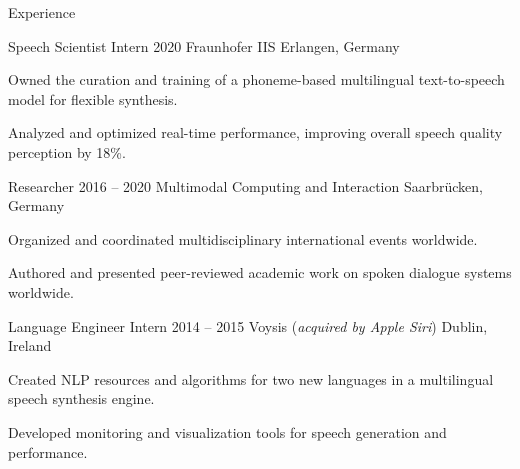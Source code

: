 \documentclass{resume} %
\begin{document}
\begin{rSection}{Experience}
\begin{rSubsection}
\end{rSubsection}

\begin{rSubsection}
	{Speech Scientist Intern}
	{2020}
	{Fraunhofer IIS}
	{Erlangen, Germany}
	
	\setlength{\itemindent}{.5cm}
	
	\item Owned the curation and training of a phoneme-based multilingual text-to-speech model for flexible synthesis.
	\item Analyzed and optimized real-time performance, improving overall speech quality perception by 18\%.
\end{rSubsection}

\begin{rSubsection}
	{Researcher}
	{2016 -- 2020}
	{Multimodal Computing and Interaction}
	{Saarbrücken, Germany}
	
	\setlength{\itemindent}{.5cm}
	
	\item Organized and coordinated multidisciplinary international events worldwide.
	\item Authored and presented peer-reviewed academic work on spoken dialogue systems worldwide.
\end{rSubsection}

%	
%	

\begin{rSubsection}
	{Language Engineer Intern}
	{2014 -- 2015}
	{Voysis (\textit{acquired by Apple Siri})}
	{Dublin, Ireland}
	
	\setlength{\itemindent}{.5cm}

	\item Created NLP resources and algorithms for two new languages in a multilingual speech synthesis engine.
	\item Developed monitoring and visualization tools for speech generation and performance.
\end{rSubsection}


\end{rSection}
\end{document}
